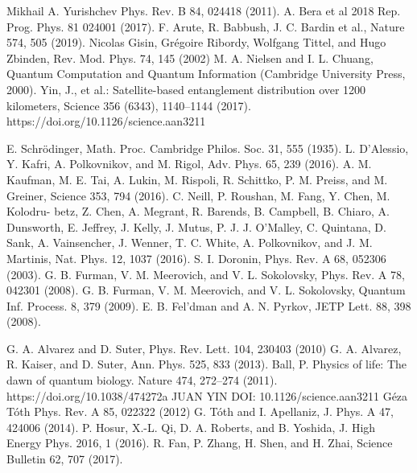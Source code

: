 \begin{thebibliography}{}



 Mikhail A. Yurishchev Phys. Rev. B 84, 024418 (2011).
 A. Bera et al 2018 Rep. Prog. Phys. 81 024001 (2017).
 F. Arute, R. Babbush, J. C. Bardin et al., Nature 574, 505 (2019).
 Nicolas Gisin, Grégoire Ribordy, Wolfgang Tittel, and Hugo Zbinden, Rev. Mod. Phys. 74, 145 (2002)
 M. A. Nielsen and I. L. Chuang, Quantum Computation and Quantum Information (Cambridge University Press, 2000).
 Yin, J., et al.: Satellite-based entanglement distribution over 1200 kilometers, Science 356 (6343), 1140–1144 (2017). https://doi.org/10.1126/science.aan3211

 E. Schr\"odinger, Math. Proc. Cambridge Philos. Soc. 31, 555 (1935).
 L. D’Alessio, Y. Kafri, A. Polkovnikov, and M. Rigol, Adv. Phys. 65, 239 (2016).
 A. M. Kaufman, M. E. Tai, A. Lukin, M. Rispoli, R. Schittko, P. M. Preiss, and M. Greiner, Science 353, 794 (2016).
 C. Neill, P. Roushan, M. Fang, Y. Chen, M. Kolodru- betz, Z. Chen, A. Megrant, R. Barends, B. Campbell, B. Chiaro, A. Dunsworth, E. Jeffrey, J. Kelly, J. Mutus, P. J. J. O’Malley, C. Quintana, D. Sank, A. Vainsencher, J. Wenner, T. C. White, A. Polkovnikov, and J. M. Martinis, Nat. Phys. 12, 1037 (2016).
 S. I. Doronin, Phys. Rev. A 68, 052306 (2003).
 G. B. Furman, V. M. Meerovich, and V. L. Sokolovsky, Phys. Rev. A 78, 042301 (2008).
 G. B. Furman, V. M. Meerovich, and V. L. Sokolovsky, Quantum Inf. Process. 8, 379 (2009).
 E. B. Fel'dman and A. N. Pyrkov, JETP Lett. 88, 398 (2008).

 G. A. Alvarez and D. Suter, Phys. Rev. Lett. 104, 230403 (2010)
 G. A. Alvarez, R. Kaiser, and D. Suter, Ann. Phys. 525,
833 (2013).
%
 Ball, P. Physics of life: The dawn of quantum biology. Nature 474, 272–274 (2011). https://doi.org/10.1038/474272a
 JUAN YIN DOI: 10.1126/science.aan3211
 G\'eza T\'oth Phys. Rev. A 85, 022322 (2012)
 G. T\'oth and I. Apellaniz, J. Phys. A 47, 424006 (2014).
 P. Hosur, X.-L. Qi, D. A. Roberts, and B. Yoshida, J. High Energy Phys. 2016, 1 (2016).
 R. Fan, P. Zhang, H. Shen, and H. Zhai, Science Bulletin 62, 707 (2017).


\end{thebibliography}
